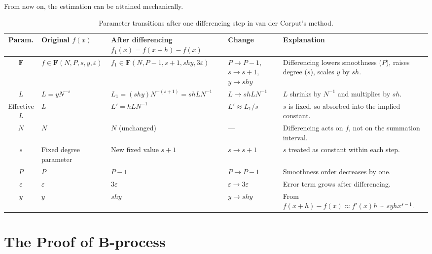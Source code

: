 From now on, the estimation can be attained mechanically.

\begin{table}[!ht]
\centering
\small
\renewcommand{\arraystretch}{1.2}
\setlength{\tabcolsep}{4pt}
\begin{tabular}{|c|p{3.2cm}|p{3.2cm}|p{2.3cm}|p{5cm}|}
\hline
\textbf{Param.} & \textbf{Original $f(x)$} 
& \textbf{After differencing $f_1(x)=f(x+h)-f(x)$} 
& \textbf{Change} 
& \textbf{Explanation} \\ \hline

$\mathbf{F}$ 
& $f \in \mathbf{F}(N, P, s, y, \varepsilon)$ 
& $f_1 \in \mathbf{F}(N, P-1, s+1, shy, 3\varepsilon)$ 
& $P\!\to\!P\!-\!1$, $s\!\to\!s\!+\!1$, $y\!\to\!shy$ 
& Differencing lowers smoothness ($P$), raises degree ($s$), scales $y$ by $sh$. \\ \hline

$L$ 
& $L = y N^{-s}$ 
& $L_1 = (shy) N^{-(s+1)} = s h L N^{-1}$ 
& $L\!\to\! s h L N^{-1}$ 
& $L$ shrinks by $N^{-1}$ and multiplies by $sh$. \\ \hline

Effective $L$ 
& $L$ 
& $L' = h L N^{-1}$ 
& $L' \!\approx\! L_1 / s$ 
& $s$ is fixed, so absorbed into the implied constant. \\ \hline

$N$ 
& $N$ 
& $N$ (unchanged) 
& --- 
& Differencing acts on $f$, not on the summation interval. \\ \hline

$s$ 
& Fixed degree parameter 
& New fixed value $s+1$ 
& $s\!\to\!s\!+\!1$ 
& $s$ treated as constant within each step. \\ \hline

$P$ 
& $P$ 
& $P-1$ 
& $P\!\to\!P\!-\!1$ 
& Smoothness order decreases by one. \\ \hline

$\varepsilon$ 
& $\varepsilon$ 
& $3\varepsilon$ 
& $\varepsilon\!\to\!3\varepsilon$ 
& Error term grows after differencing. \\ \hline

$y$ 
& $y$ 
& $shy$ 
& $y\!\to\!shy$ 
& From $f(x+h)-f(x)\!\approx\!f'(x)h\!\sim\!s y h x^{s-1}$. \\ \hline

\end{tabular}
\caption{Parameter transitions after one differencing step in van der Corput’s method.}
\end{table}
\newpage

\section{The Proof of B-process}

